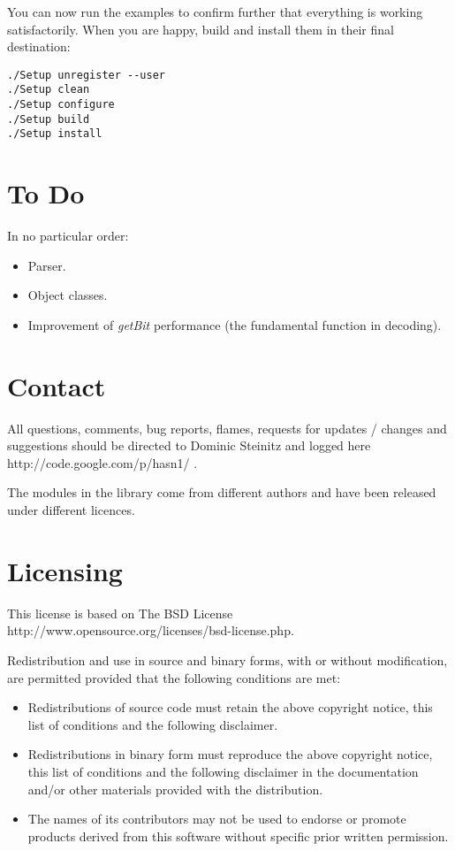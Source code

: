 \documentclass{article}
\begin{document}
You can now run the examples to confirm further that everything
is working satisfactorily.
When you are happy, build and install them in
their final destination:

\begin{lstlisting}[frame=single]
./Setup unregister --user
./Setup clean
./Setup configure
./Setup build
./Setup install
\end{lstlisting}

\section{To Do}

In no particular order:

\begin{itemize}

\item
Parser.

\item
Object classes.

\item
Improvement of {\em getBit} performance (the fundamental function in decoding).

\end{itemize}

\section{Contact}

All questions, comments, bug reports, flames, requests for 
updates / changes and suggestions should be directed to Dominic Steinitz and
logged
\htmladdnormallinkfoot
{here}
{http://code.google.com/p/hasn1/}
.


The modules in the library come from different authors and have been 
released under different licences. 

\section{Licensing}

This license is based on
\htmladdnormallinkfoot
{The BSD License}
{http://www.opensource.org/licenses/bsd-license.php}.

Redistribution and use in source and binary forms, with or without 
modification, are permitted provided that the following conditions are met:

\begin{itemize}
\item
Redistributions of source code must retain the above copyright notice, 
this list of conditions and the following disclaimer.
\item
Redistributions in binary form must reproduce the above copyright notice, 
this list of conditions and the following disclaimer in the documentation 
and/or other materials provided with the distribution.
\item
The names of its contributors may not be used to endorse or promote 
products derived from this software without specific prior written permission.
\end{itemize}
\end{document}
